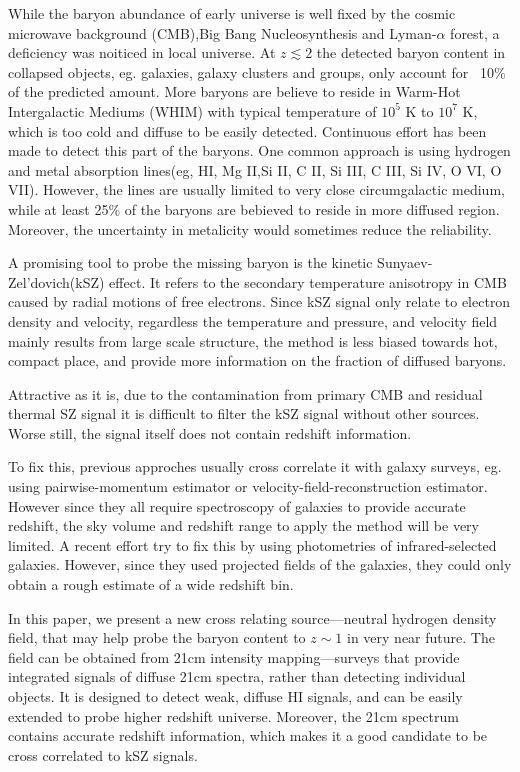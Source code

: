 While the baryon abundance of early universe is well fixed by the cosmic microwave background (CMB),Big Bang Nucleosynthesis and Lyman-$\alpha$ forest\cite{Cooke14}\cite{Fukugita98}\cite{Komatsu11}\cite{Hinshaw13}, 
a deficiency was noiticed in local universe.
At $z\lesssim 2$ the detected baryon content in collapsed
objects, eg. galaxies, galaxy clusters and groups, only account for ~10$\%$ of the predicted amount.
More baryons are believe to reside in Warm-Hot Intergalactic Mediums (WHIM) with typical temperature of $10^5$ K to $10^7$ K\cite{Soltan06}, which is too cold and diffuse to be easily detected.
Continuous effort has been made to detect this part of the baryons. 
One common approach is using hydrogen and metal absorption lines(eg, HI, Mg II,Si II, C II, Si III, C III, Si IV, O VI, O VII).\cite{Fukugita04}\cite{Werk14}
However, the lines are usually limited to very close circumgalactic medium, while at least 25\% of the baryons are bebieved to reside in more diffused region\cite{Dave10}. Moreover, the uncertainty in metalicity would sometimes reduce the reliability.

A promising tool to probe the missing baryon is the kinetic Sunyaev-Zel'dovich(kSZ) effect\cite{Sunyaev72}\cite{Sunyaev80}. 
It refers to the secondary temperature anisotropy in CMB caused by radial motions of free electrons.
Since kSZ signal only relate to electron density and velocity, 
regardless the temperature and pressure, 
and velocity field mainly results from large scale structure, 
the method is less biased towards hot, compact place, 
and provide more information on the fraction of diffused baryons.

Attractive as it is, 
due to the contamination from primary CMB and residual thermal SZ signal
it is difficult to filter the kSZ signal without other sources. 
Worse still, the signal itself does not contain redshift information.

To fix this, previous approches usually cross correlate it with galaxy surveys, 
eg. using pairwise-momentum estimator\cite{Hand12} or velocity-field-reconstruction estimator\cite{Shao11}\cite{Li14}. 
However since they all require spectroscopy of galaxies to provide accurate redshift, the sky volume and redshift range to apply the method will be very limited. 
A recent effort try to fix this by using photometries of infrared-selected galaxies. 
However, since they used projected fields of the galaxies, they could only obtain a rough estimate of a wide redshift bin\cite{Hill16}.

In this paper, we present a new cross relating source---neutral hydrogen density field, 
that may help probe the baryon content to $z\sim1$ in very near future.
The field can be obtained from 21cm intensity mapping---surveys that provide integrated signals of diffuse 21cm spectra, 
rather than detecting individual objects. 
It is designed to detect weak, diffuse HI signals, and can be easily extended to probe higher redshift universe.
Moreover, the 21cm spectrum contains accurate redshift information, which makes it a good candidate to be cross correlated to kSZ signals.

